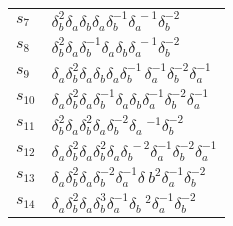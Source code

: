 \documentclass{article}
\begin{document}
\begin{center}
\begin{tabular}{ll}
$s_{7}$ & $\delta_b^{2}\delta_a^{}\delta_b^{}\delta_a^{}\delta_b^{-1}\delta_a^{\
-1}\delta_b^{-2}$ \\
$s_{8}$ & $\delta_b^{2}\delta_a^{}\delta_b^{-1}\delta_a^{}\delta_b^{}\delta_a^{\
-1}\delta_b^{-2}$ \\
$s_{9}$ & $\delta_a^{}\delta_b^{2}\delta_a^{}\delta_b^{}\delta_a^{}\delta_b^{-1\
}\delta_a^{-1}\delta_b^{-2}\delta_a^{-1}$ \\
$s_{10}$ & $\delta_a^{}\delta_b^{2}\delta_a^{}\delta_b^{-1}\delta_a^{}\delta_b^\
{}\delta_a^{-1}\delta_b^{-2}\delta_a^{-1}$ \\
$s_{11}$ & $\delta_b^{2}\delta_a^{}\delta_b^{2}\delta_a^{}\delta_b^{-2}\delta_a\
^{-1}\delta_b^{-2}$ \\
$s_{12}$ & $\delta_a^{}\delta_b^{2}\delta_a^{}\delta_b^{2}\delta_a^{}\delta_b^{\
-2}\delta_a^{-1}\delta_b^{-2}\delta_a^{-1}$ \\
$s_{13}$ & $\delta_a^{}\delta_b^{2}\delta_a^{}\delta_b^{-2}\delta_a^{-1}\delta_\
b^{2}\delta_a^{-1}\delta_b^{-2}$ \\
$s_{14}$ & $\delta_a^{}\delta_b^{2}\delta_a^{}\delta_b^{3}\delta_a^{-1}\delta_b\
^{2}\delta_a^{-1}\delta_b^{-2}$ \\
\bottomrule
\end{tabular}
\end{center}

\thispagestyle{empty}
\end{document}

